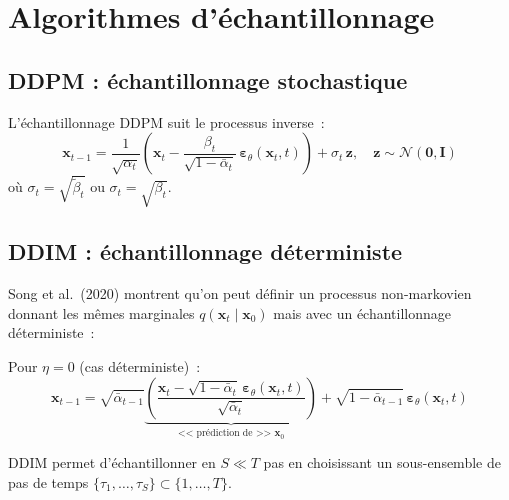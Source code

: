 \section{Algorithmes d'\'echantillonnage}
\label{sec:sampling}

\subsection{DDPM : \'echantillonnage stochastique}

L'\'echantillonnage DDPM suit le processus inverse~:
\begin{equation}
\mathbf{x}_{t-1} = \frac{1}{\sqrt{\alpha_t}}\left(\mathbf{x}_t - \frac{\beta_t}{\sqrt{1 - \bar{\alpha}_t}}\,\boldsymbol{\varepsilon}_\theta(\mathbf{x}_t, t)\right) + \sigma_t\,\mathbf{z}, \quad \mathbf{z} \sim \mathcal{N}(\mathbf{0}, \mathbf{I})
\label{eq:ddpm-sampling}
\end{equation}
o\`u $\sigma_t = \sqrt{\tilde{\beta}_t}$ ou $\sigma_t = \sqrt{\beta_t}$.

\subsection{DDIM : \'echantillonnage d\'eterministe}
\label{sec:ddim}

Song et al.\ (2020) montrent qu'on peut d\'efinir un processus non-markovien
donnant les m\^emes marginales $q(\mathbf{x}_t \mid \mathbf{x}_0)$ mais avec
un \'echantillonnage d\'eterministe~:

\begin{theoreme}
\label{thm:ddim}
Pour $\eta = 0$ (cas d\'eterministe)~:
\begin{equation}
\mathbf{x}_{t-1} = \sqrt{\bar{\alpha}_{t-1}}\underbrace{\left(\frac{\mathbf{x}_t - \sqrt{1 - \bar{\alpha}_t}\,\boldsymbol{\varepsilon}_\theta(\mathbf{x}_t, t)}{\sqrt{\bar{\alpha}_t}}\right)}_{\text{<<~pr\'ediction de~>> } \mathbf{x}_0} + \sqrt{1 - \bar{\alpha}_{t-1}}\,\boldsymbol{\varepsilon}_\theta(\mathbf{x}_t, t)
\label{eq:ddim}
\end{equation}
\end{theoreme}

\begin{remarque}
DDIM permet d'\'echantillonner en $S \ll T$ pas en choisissant un sous-ensemble
de pas de temps $\{\tau_1, \ldots, \tau_S\} \subset \{1, \ldots, T\}$.
\end{remarque}

